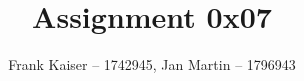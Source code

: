 \documentclass{article}
\begin{document}
	
	\title{Assignment 0x07}
	\author{Frank Kaiser -- 1742945, Jan Martin -- 1796943}
	
	\maketitle
	
	\tableofcontents
	
	
	
	
\end{document}
